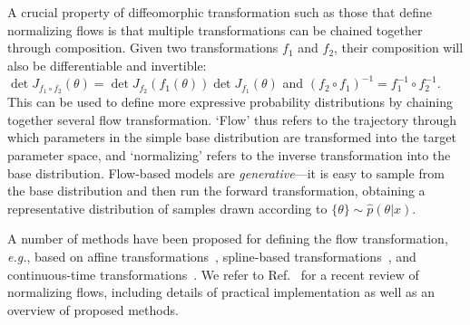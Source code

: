 \documentclass[prd,aps,10pt,nofootinbib,twocolumn,superscriptaddress,preprintnumbers,balancelastpage,longbibliography]{revtex4-1}
\begin{document}
A crucial property of diffeomorphic transformation such as those that define normalizing flows is that multiple transformations can be chained together through composition. Given two transformations $f_1$ and $f_2$, their composition will also be differentiable and invertible: $\operatorname{det}J_{f_{1}\circ f_2}(\theta) = \operatorname{det}J_{f_{2}}\left(f_1(\theta)\right)\operatorname{det}J_{f_{1}}(\theta)$ and $(f_2 \circ f_1)^{-1} = f_1^{-1} \circ f_2^{-1}$. This can be used to define more expressive probability distributions by chaining together several flow transformation. `Flow' thus refers to the trajectory through which parameters in the simple base distribution are transformed into the target parameter space, and `normalizing' refers to the inverse transformation into the base distribution. Flow-based models are \emph{generative}---it is easy to sample from the base distribution and then run the forward transformation, obtaining a representative distribution of samples drawn according to $\{\theta\}\sim\hat p(\theta|x)$.

A number of methods have been proposed for defining the flow transformation, \emph{e.g.}, based on affine transformations~\cite{10.5555/3294771.3294994,kingma2016improved,dinh2016density,dinh2014nice}, spline-based transformations~\cite{durkan2019neural,durkan2019cubic}, and continuous-time transformations~\cite{grathwohl2018ffjord}. We refer to Ref.~\cite{papamakarios2019normalizing} for a recent review of normalizing flows, including details of practical implementation as well as an overview of proposed methods. \\
\end{document}
